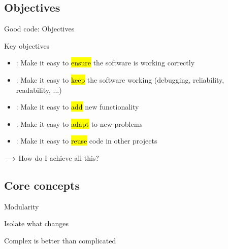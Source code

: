 
\subsection{Objectives}


\begin{frame}{Good code: Objectives}
\begin{block}{Key objectives}{\relax}
	\begin{itemize}
		\item {}: Make it easy to \hl{ensure} the software is working correctly
		\item {}: Make it easy to \hl{keep} the software working (debugging, reliability, readability, ...)
		\item {}: Make it easy to \hl{add} new functionality
		\item {}: Make it easy to \hl{adapt} to new problems
		\item {}: Make it easy to \hl{reuse} code in other projects
	\end{itemize}
\end{block}

\bigskip
{\Large $\longrightarrow$ How do I achieve all this?}

\end{frame}

\subsection{Core concepts}

\begin{frame}{Modularity}
	
\end{frame}

\begin{frame}{Isolate what changes}
	
\end{frame}

\begin{frame}{Complex is better than complicated}

\end{frame}




